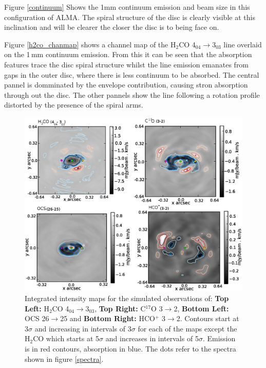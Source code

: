 \documentclass[useAMS,usenatbib]{mn2e}
\begin{document}
Figure \ref{continuum} Shows the 1mm continuum emission and beam size in this configuration of ALMA. The spiral structure of the disc is clearly visible at this inclination and will be clearer the closer the disc is to being face on. \smallskip 

Figure \ref{h2co_chanmap} shows a channel map of the H$_2$CO 4$_{04}\rightarrow$3$_{03}$ line overlaid on the 1$\,$mm continuum emission. From this it can be seen that the absorption features trace the disc spiral structure whilst the line emission emanates from gaps in the outer disc, where there is less continuum to be absorbed. The central pannel is domminated by the envelope contribution, causing stron absorption through out the disc. The other pannels show the line following a rotation profile distorted by the presence of the spiral arms. \smallskip


\begin{figure}
 \includegraphics[width=168mm]{Figures/sim/casa_all_30deg_contSub_dots.eps}
 \caption{Integrated intensity maps for the simulated observations of: {\bf Top Left:} H$_2$CO 4$_{04}\rightarrow$3$_{03}$, {\bf Top Right:} C$^{17}$O 3$\rightarrow$2, {\bf Bottom Left:} OCS 26$\rightarrow$25 and {\bf Bottom Right:} HCO$^+$ 3$\rightarrow$2. Contours start at 3$\sigma$ and increasing in intervals of 3$\sigma$ for each of the maps except the H$_2$CO which starts at 5$\sigma$ and increases in intervals of 5$\sigma$. Emission is in red contours, absorption in blue. The dots refer to the spectra shown in figure \ref{spectra}.}
\label{mom0_maps}
\end{figure}
\end{document}
